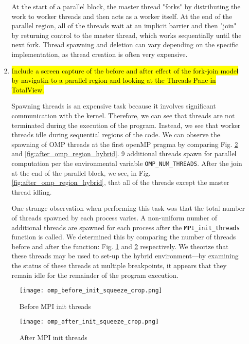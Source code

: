 \documentclass{article}
\begin{document}
\begin{enumerate}
	At the start of a parallel block,
	the master thread "forks" by distributing the work to worker threads and then acts as a worker itself.
	At the end of the parallel region, all of the threads wait at an implicit barrier and then "join" by
	returning control to the master thread, which works sequentially until the next fork.
	Thread spawning and deletion can vary depending on the specific implementation, as thread creation is 
	often very expensive.

	\item \hl{Include a screen capture of the before and after effect of the fork-join model by navigatin to a parallel region and looking at the Threads Pane in TotalView.} ~
	
	Spawning threads is an expensive task because it involves significant 
	communication with the kernel. Therefore, we can see that threads are not 
	terminated during the execution of the program.
	Instead, we see that worker threads idle during sequential regions of the code.
	We can observe the spawning of OMP threads at the first openMP pragma by comparing Fig. \ref{fig:after_init_hybrid} 
	and \ref{fig:after_omp_region_hybrid}. 9 additional threads spawn 
	for parallel computation per the environmental variable \verb!OMP_NUM_THREADS!.
	After the join at the end of the parallel block, we see, in Fig. \ref{fig:after_omp_region_hybrid}, 
	that all of the threads except the master thread idling.
	
	One strange observation when performing this task was that the total number of threads spawned by each process varies. 
	A non-uniform number of additional threads are spawned for each process after the \verb!MPI_init_threads! function is called. 
	We determined this by comparing the number of threads before and after the function: Fig. \ref{fig:before_init_hybrid} and \ref{fig:after_init_hybrid} respectively.
	We theorize that these threads may be used to set-up the hybrid environment---by 	
	examining the status of these threads at multiple breakpoints, 
	it appears that they remain idle for the remainder of the program execution.
	
\end{enumerate}

\begin{figure}
    \begin{center}
        \texttt{[image: omp\_before\_init\_squeeze\_crop.png]}
    \caption{Before MPI init threads}
    \label{fig:before_init_hybrid}
    \end{center}
\end{figure}
\begin{figure}
    \begin{center}
        \texttt{[image: omp\_after\_init\_squeeze\_crop.png]}
    \caption{After MPI init threads}
    \label{fig:after_init_hybrid}
    \end{center}
\end{figure}
\end{document}
